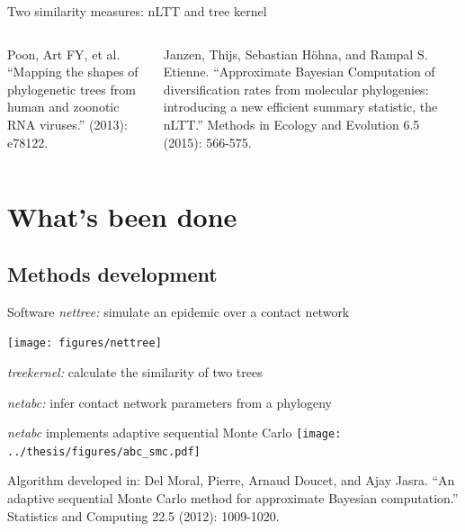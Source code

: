 \documentclass{beamer}
\begin{document}
\begin{frame}{Two similarity measures: nLTT and tree kernel}
\begin{columns}
\begin{column}{0.5\textwidth}
    \end{column}
  \end{columns}
  \begin{columns}
    \begin{column}{0.5\textwidth}
      \tiny Poon, Art FY, et al. ``Mapping the shapes of phylogenetic trees
      from human and zoonotic RNA viruses.'' (2013): e78122.
    \end{column}
    \begin{column}{0.5\textwidth}
      \tiny Janzen, Thijs, Sebastian Höhna, and Rampal S. Etienne. ``Approximate
      Bayesian Computation of diversification rates from molecular phylogenies:
      introducing a new efficient summary statistic, the nLTT.'' Methods in
      Ecology and Evolution 6.5 (2015): 566-575.
    \end{column}
  \end{columns}
\end{frame}

\section{What's been done}

\subsection{Methods development}

\begin{frame}{Software}
  \textit{nettree:} simulate an epidemic over a contact network

  \begin{center}
    \texttt{[image: figures/nettree]}
  \end{center}
  \vspace{-0.5cm}
  \pause

  \textit{treekernel:} calculate the similarity of two trees
  \pause

  \textit{netabc:} infer contact network parameters from a phylogeny
\end{frame}

\begin{frame}{\textit{netabc} implements adaptive sequential Monte Carlo}
  \vspace{-0.5cm}
  \texttt{[image: ../thesis/figures/abc\_smc.pdf]}

  {\footnotesize Algorithm developed in: Del Moral, Pierre, Arnaud Doucet, and Ajay
  Jasra. ``An adaptive sequential Monte Carlo method for approximate Bayesian
  computation.'' Statistics and Computing 22.5 (2012): 1009-1020.}
\end{frame}
\end{document}
